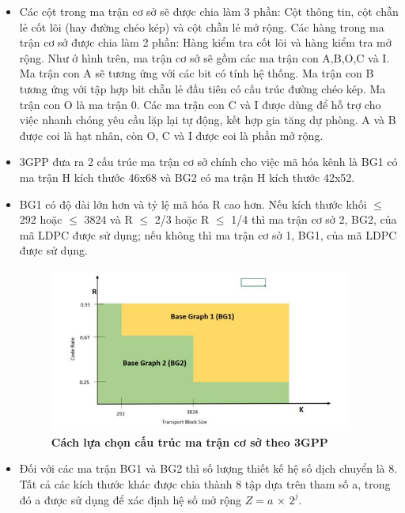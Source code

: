 \documentclass{article}
\begin{document}
\begin{itemize}
    \item  Các cột trong ma trận cơ sở sẽ được chia làm 3 phần: Cột thông tin, cột chẵn lẻ cốt lõi (hay đường chéo kép) và cột chẵn lẻ mở rộng. Các hàng trong ma trận cơ sở được chia làm 2 phần: Hàng kiểm tra cốt lõi và hàng kiểm tra mở rộng. Như ở hình trên, ma trận cơ sở sẽ gồm các ma trận con A,B,O,C và I. Ma trận con A sẽ tương ứng với các bit có tính hệ thống. Ma trận con B tương ứng với tập hợp bit chẵn lẻ đầu tiên có cấu trúc đường chéo kép. Ma trận con O là ma trận 0. Các ma trận con C và I được dùng để hỗ trợ cho việc nhanh chóng yêu cầu lặp lại tự động, kết hợp gia tăng dự phòng. A và B được coi là hạt nhân, còn O, C và I được coi là phần mở rộng.
    \item 3GPP đưa ra 2 cấu trúc ma trận cơ sở chính cho việc mã hóa kênh là BG1 có ma trận H kích thước 46x68 và BG2 có ma trận H kích thước 42x52.
    \item BG1 có độ dài lớn hơn và tỷ lệ mã hóa R cao hơn. Nếu kích thước khối $\le$ 292 hoặc $\le$ 3824 và R $\le$ 2/3 hoặc R $\le$ 1/4 thì ma trận cơ sở 2, BG2, của mã LDPC được sử dụng; nếu không thì ma trận cơ sở 1, BG1, của mã LDPC được sử dụng.
    \begin{figure}[H]
    \centering
    \includegraphics[width=10cm]{images/3gpp.JPG}
    \caption[Cách lựa chọn cấu trúc ma trận cơ sở theo 3GPP]{\bfseries\fontsize{12pt}{0pt} \selectfont Cách lựa chọn cấu trúc ma trận cơ sở theo 3GPP} %
    \label{hinh12}
\end{figure}
    \item Đối với các ma trận BG1 và BG2 thì số lượng thiết kế hệ số dịch chuyển là 8. Tất cả các kích thước khác được chia thành 8 tập dựa trên tham số a, trong đó a được sử dụng để xác định hệ số mở rộng $Z = a$ × $ 2^j$.
    

\end{itemize}
\end{document}
